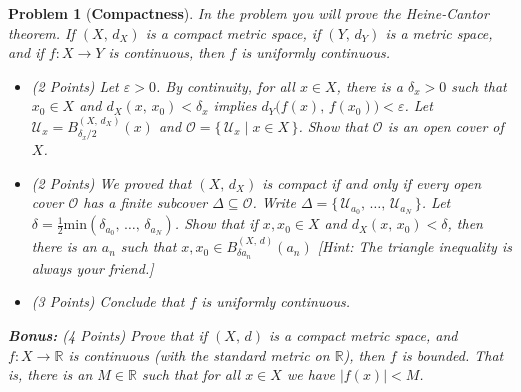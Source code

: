 \documentclass{article}
\theoremstyle{normal}
\newtheorem{problem}{Problem}
\begin{document}
\begin{problem}[\textbf{Compactness}]
        In the problem you will prove the \textit{Heine-Cantor theorem}.
        If $(X,\,d_{X})$ is a compact metric space, if $(Y,\,d_{Y})$ is a
        metric space, and if $f:X\rightarrow{Y}$ is continuous, then $f$ is
        uniformly continuous.
        \begin{itemize}
            \item (2 Points)
                Let $\varepsilon>0$. By continuity, for all $x\in{X}$, there
                is a $\delta_{x}>0$ such that $x_{0}\in{X}$ and
                $d_{X}(x,\,x_{0})<\delta_{x}$ implies
                $d_{Y}\big(f(x),\,f(x_{0})\big)<\varepsilon$.
                Let $\mathcal{U}_{x}=B_{\delta_{x}/2}^{(X,\,d_{X})}(x)$ and
                $\mathcal{O}=\{\,\mathcal{U}_{x}\;|\;x\in{X}\,\}$. Show that
                $\mathcal{O}$ is an open cover of $X$.
            \item (2 Points) We proved that $(X,\,d_{X})$ is compact
                if and only if every
                open cover $\mathcal{O}$ has a finite subcover
                $\Delta\subseteq\mathcal{O}$. Write
                $\Delta=\{\,\mathcal{U}_{a_{0}},\,\dots,\,\mathcal{U}_{a_{N}}\,\}$.
                Let
                $\delta=\frac{1}{2}\textrm{min}(\delta_{a_{0}},\,\dots,\,\delta_{a_{N}})$.
                Show that if $x,x_{0}\in{X}$ and
                $d_{X}(x,\,x_{0})<\delta$, then there is an
                $a_{n}$ such that $x,x_{0}\in{B}_{\delta{a}_{n}}^{(X,\,d)}(a_{n})$
                [Hint: The triangle inequality is always your friend.]
            \item (3 Points) Conclude that $f$ is uniformly continuous.
        \end{itemize}
        \textbf{Bonus:} (4 Points) Prove that if $(X,\,d)$ is a compact metric
        space, and $f:X\rightarrow\mathbb{R}$ is continuous (with the standard
        metric on $\mathbb{R}$), then $f$ is bounded. That is, there is an
        $M\in\mathbb{R}$ such that for all $x\in{X}$ we have
        $|f(x)|<M$.
    \end{problem}
    \clearpage
    \color{black}
\end{document}

